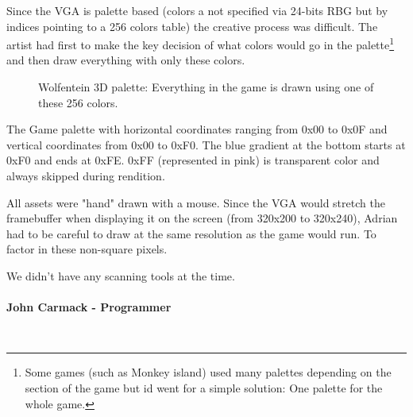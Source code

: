\documentclass[book.tex]{subfiles}
\begin{document}
\par
Since the VGA is palette based (colors a not specified via 24-bits RBG but by indices pointing to a 256 colors table) the creative process was difficult. The artist had first to make the key decision of what colors would go in the palette\footnote{Some games (such as Monkey island) used many palettes depending on the section of the game but id went for a simple solution: One palette for the whole game.} and then draw everything with only these colors.\\
\begin{figure}[H]
  \centering
{}
 \caption{Wolfentein 3D palette: Everything in the game is drawn using one of these 256 colors.}
\end{figure}
The Game palette with horizontal coordinates ranging from 0x00 to 0x0F and vertical coordinates from 0x00 to 0xF0. The blue gradient at the bottom starts at 0xF0 and ends at 0xFE. 0xFF (represented in pink) is transparent color and always skipped during rendition.\\
\par

All assets were "hand" drawn with a mouse. Since the VGA would stretch the framebuffer when displaying it on the screen (from 320x200 to 320x240), Adrian had to be careful to draw at the same resolution as the game would run. To factor in these non-square pixels.\\
\par
\begin{fancyquotes}
We didn't have any scanning tools at the time.\\
\\
\textbf{John Carmack - Programmer}
\end{fancyquotes}
\\
\end{document}
